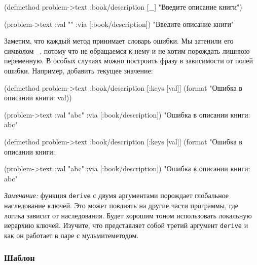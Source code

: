 \else

  \begin{clojure}
(defmethod problem->text :book/description [_]
  "Введите описание книги")

(problem->text {:val "" :via [:book/description]})
"Введите описание книги"
  \end{clojure}

\fi


Заметим, что каждый метод принимает словарь ошибки. Мы затенили его символом
\verb|_|, потому что не обращаемся к нему и не хотим порождать лишнюю
переменную. В особых случаях можно построить фразу в зависимости от полей
ошибки. Например, добавить текущее значение:

\ifx\DEVICETYPE\MOBILE

  \begin{clojure}
(defmethod problem->text
  :book/description
  [{:keys [val]}]
  (format "Ошибка в описании книги: %
    val))

(problem->text
  {:val "abc" :via [:book/description]})
"Ошибка в описании книги: abc"
  \end{clojure}

\else

  \begin{clojure}
(defmethod problem->text :book/description
  [{:keys [val]}]
  (format "Ошибка в описании книги: %

(problem->text {:val "abc" :via [:book/description]})
"Ошибка в описании книги: abc"
  \end{clojure}

\fi

\emph{Замечание:} функция \verb|derive| с двумя аргументами порождает глобальное
наследование ключей. Это может повлиять на другие части программы, где логика
зависит от наследования. Будет хорошим тоном использовать локальную иерархию
ключей. Изучите, что представляет собой третий аргумент \verb|derive| и как он
работает в паре с мульмитеметодом.

\subsubsection{Шаблон}


